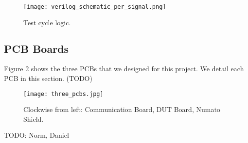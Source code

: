 \begin{figure}
\texttt{[image: verilog\_schematic\_per\_signal.png]}
\caption{Test cycle logic.}
\label{fig:test_cycle_logic}
\end{figure}

\subsection{PCB Boards}
Figure \ref{fig:three_pcbs} shows the three PCBs that we designed for this project. We detail each PCB in this section. (TODO) 

\begin{figure}
\texttt{[image: three\_pcbs.jpg]}
\caption{Clockwise from left: Communication Board, DUT Board, Numato Shield.}
\label{fig:three_pcbs}
\end{figure}


TODO: Norm, Daniel
\newpage